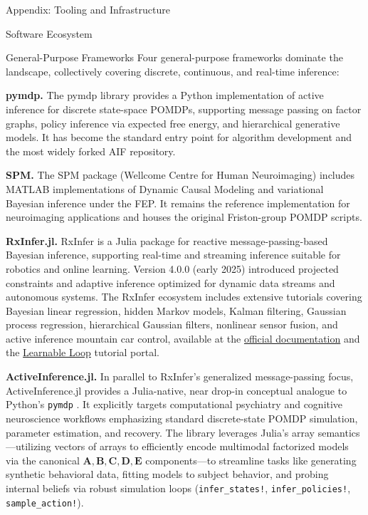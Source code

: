 \documentclass[
  ignorenonframetext,
]{beamer}
\begin{document}
\begin{frame}[fragile]{Appendix: Tooling and Infrastructure
\label{sec:tooling}}
\begin{block}{Software Ecosystem}
\begin{block}{General-Purpose Frameworks}
\protect{}\label{general-purpose-frameworks}
Four general-purpose frameworks dominate the landscape, collectively
covering discrete, continuous, and real-time inference:

\textbf{pymdp.} The pymdp library \citep{heins2022pymdp} provides a
Python implementation of active inference for discrete state-space
POMDPs, supporting message passing on factor graphs, policy inference
via expected free energy, and hierarchical generative models. It has
become the standard entry point for algorithm development and the most
widely forked AIF repository.

\textbf{SPM.} The SPM package (Wellcome Centre for Human Neuroimaging)
includes MATLAB implementations of Dynamic Causal Modeling and
variational Bayesian inference under the FEP. It remains the reference
implementation for neuroimaging applications and houses the original
Friston-group POMDP scripts.

\textbf{RxInfer.jl.} RxInfer is a Julia package for reactive
message-passing-based Bayesian inference, supporting real-time and
streaming inference suitable for robotics and online learning. Version
4.0.0 (early 2025) \citep{rxinfer2025} introduced projected constraints
and adaptive inference optimized for dynamic data streams and autonomous
systems. The RxInfer ecosystem includes extensive tutorials covering
Bayesian linear regression, hidden Markov models, Kalman filtering,
Gaussian process regression, hierarchical Gaussian filters, nonlinear
sensor fusion, and active inference mountain car control, available at
the \href{https://reactivebayes.github.io/RxInfer.jl/stable/}{official
documentation} and the \href{https://learnableloop.com/}{Learnable Loop}
tutorial portal.

\textbf{ActiveInference.jl.} In parallel to RxInfer's generalized
message-passing focus, ActiveInference.jl provides a Julia-native, near
drop-in conceptual analogue to Python's \texttt{pymdp}
\citep{ActiveInferencejl}. It explicitly targets computational
psychiatry and cognitive neuroscience workflows emphasizing standard
discrete-state POMDP simulation, parameter estimation, and recovery. The
library leverages Julia's array semantics---utilizing vectors of arrays
to efficiently encode multimodal factorized models via the canonical
\(\mathbf{A}, \mathbf{B}, \mathbf{C}, \mathbf{D}, \mathbf{E}\)
components---to streamline tasks like generating synthetic behavioral
data, fitting models to subject behavior, and probing internal beliefs
via robust simulation loops (\texttt{infer\_states!},
\texttt{infer\_policies!}, \texttt{sample\_action!}).


\end{block}
\end{block}
\end{frame}
\end{document}
